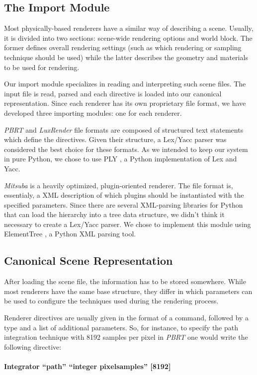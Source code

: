 \subsection{The Import Module}
Most physically-based renderers have a similar way of describing a scene.
Usually, it is divided into two sections: scene-wide rendering options and
world block. The former defines overall rendering settings (such as which
rendering or sampling technique should be used) while the latter describes the
geometry and materials to be used for rendering.

Our import module specializes in reading and interpreting such scene files. The
input file is read, parsed and each directive is loaded into our canonical
representation. Since each renderer has its own proprietary file format, we have
developed three importing modules: one for each renderer.

\textit{PBRT} and \textit{LuxRender} file formats are composed of structured
text statements which define the directives. Given their structure, a Lex/Yacc
parser was considered the best choice for these formats. As we intended to keep
our system in pure Python, we chose to use PLY \cite{ply}, a Python
implementation of Lex and Yacc.

\textit{Mitsuba} is a heavily optimized, plugin-oriented renderer. The file
format is, essentialy, a XML description of which plugins should be instantiated
with the specified parameters. Since there are several
XML-parsing libraries for Python that can load the hierarchy into a tree data
structure, we didn't think it necessary to create a Lex/Yacc parser. We chose to
implement this module using ElementTree \cite{ET}, a Python XML parsing tool.

\subsection{Canonical Scene Representation}
After loading the scene file, the information has to be
stored somewhere. While most renderers have the same base structure, they differ
in which parameters can be used to configure the techniques used during the
rendering process.

Renderer directives are usually given in the format of a command, followed by a
type and a list of additional parameters. So, for instance, to specify the path
integration technique with 8192 samples per pixel in \textit{PBRT} one would
write the following directive: \\ \\
\indent \textbf{Integrator ``path'' ``integer pixelsamples'' [8192]}\\

